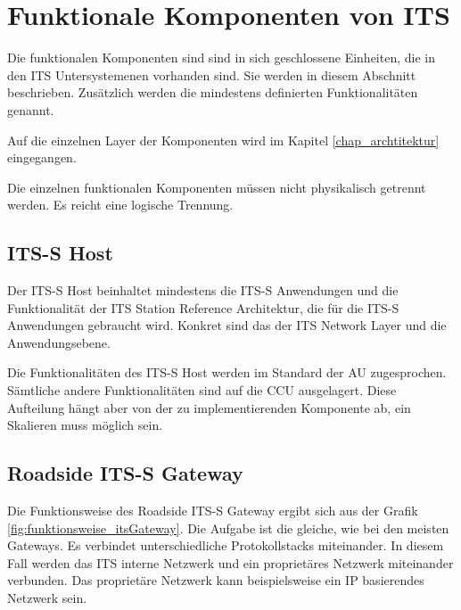 \section{Funktionale Komponenten von ITS \label{funktionsweise_funktionaleKomponenten}}
Die funktionalen Komponenten sind sind in sich geschlossene Einheiten, die in den \ac{ITS} Untersystemenen vorhanden sind. Sie werden in diesem Abschnitt beschrieben. Zusätzlich werden die mindestens definierten Funktionalitäten genannt.

Auf die einzelnen Layer der Komponenten wird im Kapitel \ref{chap_archtitektur} eingegangen.   

Die einzelnen funktionalen Komponenten müssen nicht physikalisch getrennt werden. Es reicht eine logische Trennung.  

\subsection{ITS-S Host \label{funktionsweise_ITSHost}}
Der \ac{ITS-S} Host beinhaltet mindestens die \ac{ITS-S} Anwendungen und die Funktionalität der ITS  Station Reference Architektur, die für die  \ac{ITS-S} Anwendungen gebraucht wird. Konkret sind das der \ac{ITS} Network Layer und die Anwendungsebene. 

Die Funktionalitäten des \ac{ITS-S} Host werden im Standard \cite{etsi302636-3} der \ac{AU} zugesprochen. Sämtliche andere Funktionalitäten sind auf die \ac{CCU} ausgelagert. Diese Aufteilung hängt aber von der zu implementierenden Komponente ab, ein Skalieren muss möglich sein.

\subsection{Roadside ITS-S Gateway \label{funktionsweise_RoadsideITSGateway}}
Die Funktionsweise des Roadside \ac{ITS-S} Gateway ergibt sich aus der Grafik \ref{fig:funktionsweise_itsGateway}. Die Aufgabe ist die gleiche, wie bei den meisten Gateways. Es verbindet unterschiedliche Protokollstacks miteinander. In diesem Fall werden das \ac{ITS} interne Netzwerk und ein proprietäres Netzwerk miteinander verbunden. Das proprietäre Netzwerk kann beispielsweise ein IP basierendes Netzwerk sein.

